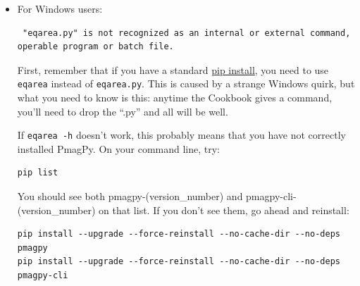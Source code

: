 \documentclass[11pt]{book}
\begin{document}
{{{\begin{enumerate}
\begin{itemize}





\item For Windows users:

\begin{verbatim} "eqarea.py" is not recognized as an internal or external command,
operable program or batch file.
\end{verbatim}

First, remember that if you have a standard \href{#pip_install}{pip install}, you need to use \texttt{eqarea} instead of \texttt{eqarea.py}. This is caused by a strange Windows quirk, but what you need to know is this: anytime the Cookbook gives a command, you'll need to drop the ``.py'' and all will be well.

If \texttt{eqarea -h} doesn't work, this probably means that you have not correctly installed PmagPy.  On your command line, try:

\begin{verbatim}
pip list
\end{verbatim}

You should see both pmagpy-(version_number) and pmagpy-cli-(version_number) on that list.  If you don't see them, go ahead and reinstall:

\begin{verbatim}
pip install --upgrade --force-reinstall --no-cache-dir --no-deps pmagpy
pip install --upgrade --force-reinstall --no-cache-dir --no-deps pmagpy-cli
\end{verbatim}


\end{itemize}
\end{enumerate}}}}
\end{document}
